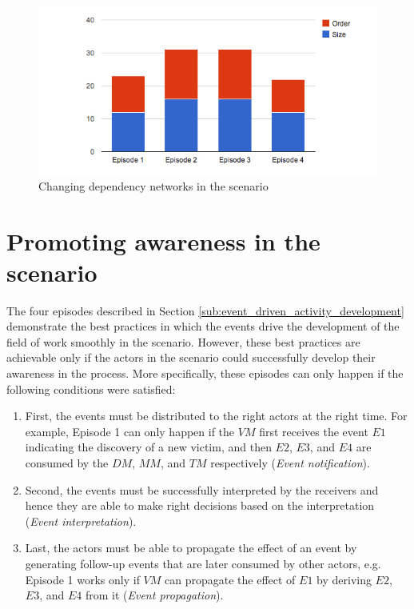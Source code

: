 \begin{figure}[htbp] %
	\centering
	\includegraphics[width=5.8in]{dynamics_of_dependencies.jpg} 
	\caption{Changing dependency networks in the scenario}
	\label{fig:dynamics_of_dependencies}
\end{figure}

\section{Promoting awareness in the scenario} %
\label{sec:promoting_awareness_in_the_scenario}
The four episodes described in Section \ref{sub:event_driven_activity_development} demonstrate the best practices in which the events drive the development of the field of work smoothly in the scenario. However, these best practices are achievable only if the actors in the scenario could successfully develop their awareness in the process. More specifically, these episodes can only happen if the following conditions were satisfied:

\begin{enumerate}
	\item First, the events must be distributed to the right actors at the right time. For example, Episode 1 can only happen if the $VM$ first receives the event $E1$ indicating the discovery of a new victim, and then $E2$, $E3$, and $E4$ are consumed by the $DM$, $MM$, and $TM$ respectively (\emph{Event notification}).
	\item Second, the events must be successfully interpreted by the receivers and hence they are able to make right decisions based on the interpretation (\emph{Event interpretation}). 
	\item Last, the actors must be able to propagate the effect of an event by generating follow-up events that are later consumed by other actors, e.g. Episode 1 works only if $VM$ can propagate the effect of $E1$ by deriving $E2$, $E3$, and $E4$ from it (\emph{Event propagation}).
\end{enumerate}

